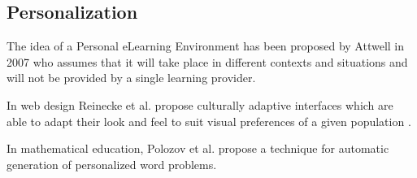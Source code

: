 \subsection{Personalization}

The idea of a Personal eLearning Environment has been proposed by Attwell in 2007 \cite{Atwell07-personal} who assumes that it will take place in different contexts and situations and will not be provided by a single learning provider.

In web design Reinecke et al. propose culturally adaptive interfaces which are able to adapt their look and feel to suit visual preferences of a given population \cite{Reinecke13-CulturalAdaptation}. 

In mathematical education, Polozov et al. propose a technique for automatic generation of personalized word problems\cite{Polozov15-AdaptableMath}.









